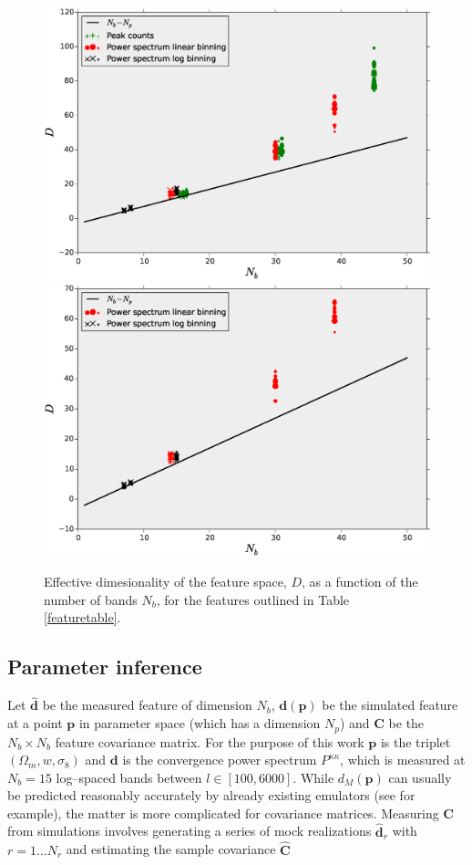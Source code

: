 \documentclass[reprint,aps,prd,superscriptaddress,showkeys,showpacs]{revtex4-1}
\newcommand{\bb}[1]{\mathbf{#1}}
\newcommand{\bbh}[1]{\mathbf{\hat{#1}}}
\begin{document}
\begin{figure}
\includegraphics[scale=0.3]{Figures/effective_nb.eps}
\includegraphics[scale=0.3]{Figures/effective_nb_gaussian.eps}
\caption{Effective dimesionality of the feature space, $D$, as a function of the number of bands $N_b$, for the features outlined in Table \ref{featuretable}.}
\label{effectivenb}
\end{figure}


\subsection{Parameter inference}
%
Let $\bbh{d}$ be the measured feature of dimension $N_b$, $\bb{d}(\bb{p})$ be the simulated feature at a point $\bb{p}$ in parameter space (which has a dimension $N_p$) and $\bb{C}$ be the $N_b\times N_b$ feature covariance matrix. For the purpose of this work $\bb{p}$ is the triplet $(\Omega_m,w,\sigma_8)$ and $\bb{d}$ is the convergence power spectrum $P^{\kappa\kappa}$, which is measured at $N_b=15$ log--spaced bands between $l\in[100,6000]$. While $d_M(\bb{p})$ can usually be predicted reasonably accurately by already existing emulators (see \citep{coyote2,Nicaea} for example), the matter is more complicated for covariance matrices. Measuring $\bb{C}$ from simulations involves generating a series of mock realizations $\bbh{d}_r$ with $r=1...N_r$ and estimating the sample covariance $\bbh{C}$
\end{document}

